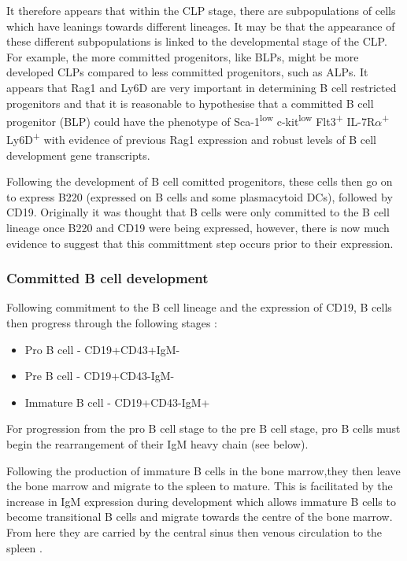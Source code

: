It therefore appears that within the CLP stage, there are subpopulations of cells which have leanings towards different lineages.
It may be that the appearance of these different subpopulations is linked to the developmental stage of the CLP.
For example, the more committed progenitors, like BLPs, might be more developed CLPs compared to less committed progenitors, such as ALPs.
It appears that Rag1 and Ly6D are very important in determining B cell restricted progenitors and that it is reasonable to hypothesise that a committed B cell progenitor (BLP) could have the phenotype of Sca-1\textsuperscript{low} c-kit\textsuperscript{low} Flt3\textsuperscript{+} IL-7R$\alpha$\textsuperscript{+} Ly6D\textsuperscript{+} with evidence of previous Rag1 expression and robust levels of B cell development gene transcripts.

Following the development of B cell comitted progenitors, these cells then go on to express B220 (expressed on B cells and some plasmacytoid DCs), followed by CD19.
Originally it was thought that B cells were only committed to the B cell lineage once B220 and CD19 were being expressed, however, there is now much evidence to suggest that this committment step occurs prior to their expression.


\subsubsection{Committed B cell development}

Following commitment to the B cell lineage and the expression of CD19, B cells then progress through the following stages \citep{Cambier2007}:
\begin{itemize}
\item Pro B cell - CD19+CD43+IgM-
\item Pre B cell - CD19+CD43-IgM-
\item Immature B cell - CD19+CD43-IgM+
\end{itemize}

For progression from the pro B cell stage to the pre B cell stage, pro B cells must begin the rearrangement of their IgM heavy chain (see below).

Following the production of immature B cells in the bone marrow,they then leave the bone marrow and migrate to the spleen to mature.
This is facilitated by the increase in IgM expression during development which allows immature B cells to become transitional B cells and migrate towards the centre of the bone marrow. 
From here they are carried by the central sinus then venous circulation to the spleen \citep{Loder1999}.


